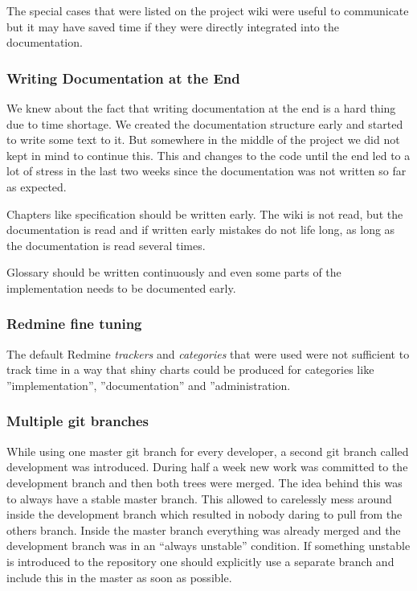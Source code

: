 The special cases that were listed on the project wiki were useful to 
communicate but it may have saved time if they were directly integrated into 
the documentation.

\subsubsection*{Writing Documentation at the End}

We knew about the fact that writing documentation at the end is a hard thing
due to time shortage. We created the documentation structure early and started
to write some text to it. But somewhere in the middle of the project we did not
kept in mind to continue this. This and changes to the code until the end led
to a lot of stress in the last two weeks since the documentation was not
written so far as expected.

Chapters like specification should be written early. The wiki is not read, but
the documentation is read and if written early mistakes do not life long, as
long as the documentation is read several times.

Glossary should be written continuously and even some parts of the
implementation needs to be documented early.

\subsubsection*{Redmine fine tuning}

The default Redmine \textit{trackers} and \textit{categories} that were used 
were not sufficient to track time in a way that shiny charts could be produced 
for categories like ''implementation'', ''documentation'' and ''administration. 

\subsubsection*{Multiple git branches}

While using one master git branch for every developer, a second git branch 
called development was introduced. During half a week new work was committed to
the
development branch and then both trees were merged. The idea behind this was to
always have a stable master branch. This allowed to carelessly mess around
inside the development branch which resulted in nobody daring
to pull from the others branch. Inside the master branch everything was already
merged and
the development branch was in an ``always unstable'' condition.
If something unstable is introduced to the repository one should explicitly use
a separate branch and include this in the master as soon as possible.
